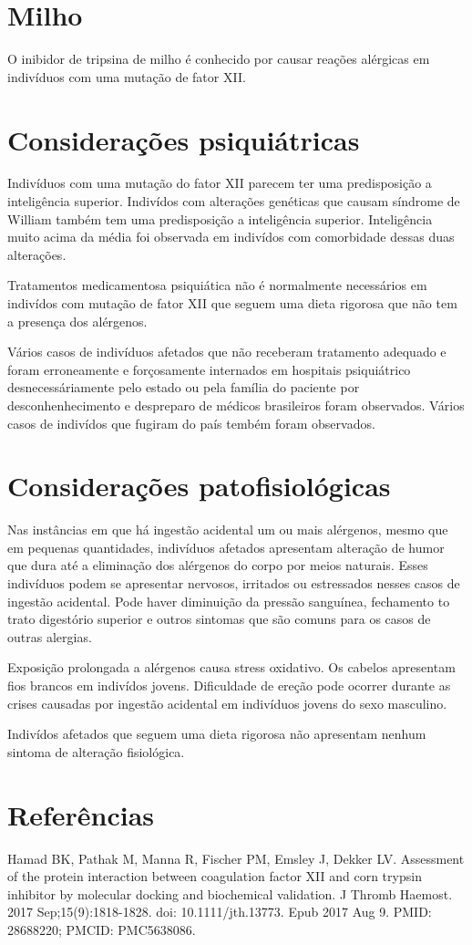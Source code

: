 \documentclass{article}
\begin{document}
\section{Milho}

O inibidor de tripsina de milho é conhecido por causar reações
alérgicas em indivíduos com uma mutação de fator XII.

\section{Considerações psiquiátricas}

Indivíduos com uma mutação do fator XII parecem ter uma predisposição
a inteligência superior. Indivídos com alterações genéticas que causam
síndrome de William também tem uma predisposição a inteligência superior.
Inteligência muito acima da média foi observada em indivídos com comorbidade
dessas duas alterações.

Tratamentos medicamentosa psiquiática não é normalmente necessários
em indivídos
com mutação de fator XII que seguem uma dieta rigorosa que não tem a
presença dos alérgenos.

Vários casos de indivíduos afetados que não receberam tratamento adequado
e foram erroneamente e forçosamente internados em hospitais psiquiátrico
desnecessáriamente pelo estado ou pela família do paciente por
desconhenhecimento e despreparo de médicos brasileiros foram observados.
Vários casos de indivídos que fugiram do país tembém foram observados.

\section{Considerações patofisiológicas}

Nas instâncias em que há ingestão acidental um ou mais alérgenos, mesmo
que em pequenas quantidades, indivíduos afetados apresentam alteração de
humor que dura até a eliminação dos alérgenos do corpo por meios naturais.
Esses indivíduos podem se apresentar nervosos, irritados ou estressados
nesses casos de ingestão acidental. Pode haver diminuição da pressão
sanguínea, fechamento to trato digestório superior e outros sintomas que
são comuns para os casos de outras alergias.

Exposição prolongada a alérgenos causa stress oxidativo. Os cabelos
apresentam fios brancos em indivídos jovens. Dificuldade de ereção pode
ocorrer durante as crises causadas por ingestão acidental em indivíduos
jovens do sexo masculino.

Indivídos afetados que seguem uma dieta rigorosa não apresentam nenhum
sintoma de alteração fisiológica.

\section{Referências}

Hamad BK, Pathak M, Manna R, Fischer PM, Emsley J, Dekker LV. Assessment of the protein interaction between coagulation factor XII and corn trypsin inhibitor by molecular docking and biochemical validation. J Thromb Haemost. 2017 Sep;15(9):1818-1828. doi: 10.1111/jth.13773. Epub 2017 Aug 9. PMID: 28688220; PMCID: PMC5638086.
\end{document}
